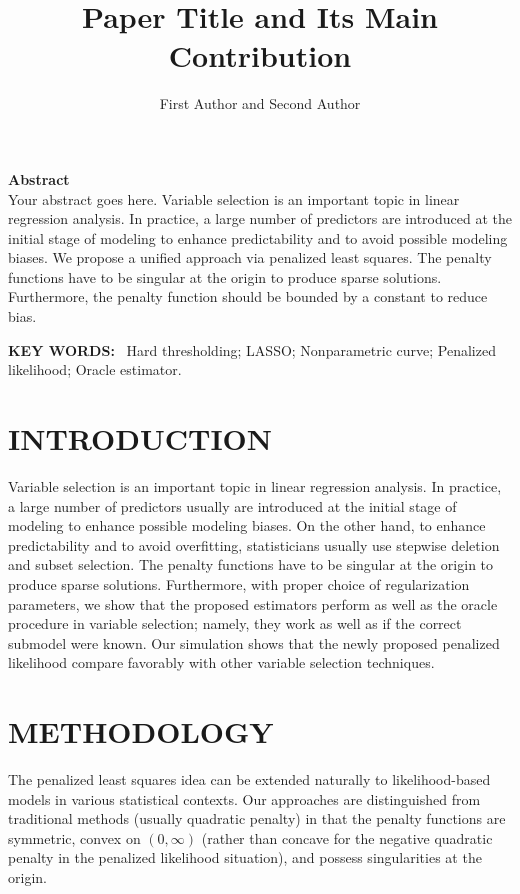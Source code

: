 \documentclass[8pt,twocolumn]{article}
\title{\textbf{Paper Title and Its Main Contribution}}
\author{First Author and Second Author\\
}
\date{}
\newenvironment{abstractbox}{%
  \begin{mdframed}[backgroundcolor=lightgray,
                   linewidth=0.5pt,
                   linecolor=black,
                   topline=true,
                   bottomline=true,
                   leftline=true,
                   rightline=true,
                   innerleftmargin=10pt,
                   innerrightmargin=10pt,
                   innertopmargin=10pt,
                   innerbottommargin=10pt]
}{%
  \end{mdframed}
}
\begin{document}
\maketitle

\begin{abstractbox}
\noindent\textbf{Abstract} \\
Your abstract goes here. Variable selection is an important topic in linear regression analysis. In practice, a large number of predictors are introduced at the initial stage of modeling to enhance predictability and to avoid possible modeling biases. We propose a unified approach via penalized least squares. The penalty functions have to be singular at the origin to produce sparse solutions. Furthermore, the penalty function should be bounded by a constant to reduce bias.

\vspace{0.5em}
\noindent\textbf{KEY WORDS:} \ Hard thresholding; LASSO; Nonparametric curve; Penalized likelihood; Oracle estimator.
\end{abstractbox}


\section{INTRODUCTION}

Variable selection is an important topic in linear regression analysis. In practice, a large number of predictors usually are introduced at the initial stage of modeling to enhance possible modeling biases. On the other hand, to enhance predictability and to avoid overfitting, statisticians usually use stepwise deletion and subset selection. The penalty functions have to be singular at the origin to produce sparse solutions. Furthermore, with proper choice of regularization parameters, we show that the proposed estimators perform as well as the oracle procedure in variable selection; namely, they work as well as if the correct submodel were known. Our simulation shows that the newly proposed penalized likelihood compare favorably with other variable selection techniques.

\section{METHODOLOGY}

The penalized least squares idea can be extended naturally to likelihood-based models in various statistical contexts. Our approaches are distinguished from traditional methods (usually quadratic penalty) in that the penalty functions are symmetric, convex on $(0, \infty)$ (rather than concave for the negative quadratic penalty in the penalized likelihood situation), and possess singularities at the origin.
\end{document}
